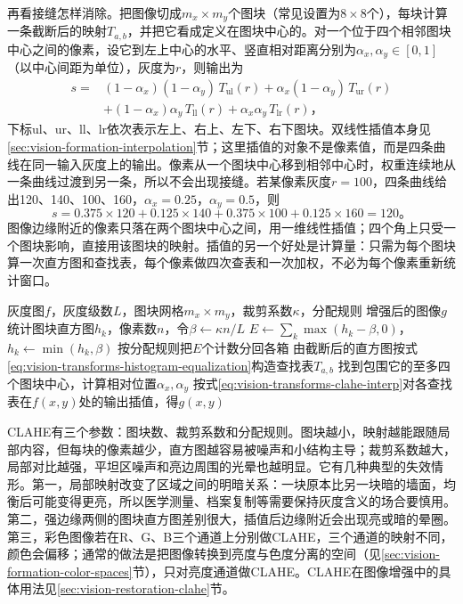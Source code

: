 再看接缝怎样消除。把图像切成$m_x\times m_y$个图块（常见设置为$8\times8$个），每块计算一条截断后的映射$T_{a,b}$，并把它看成定义在图块中心的。对一个位于四个相邻图块中心之间的像素，设它到左上中心的水平、竖直相对距离分别为$\alpha_x,\alpha_y\in[0,1]$（以中心间距为单位），灰度为$r$，则输出为
\begin{equation}
  \begin{aligned}
  s={}&(1-\alpha_x)(1-\alpha_y)\,T_{\mathrm{ul}}(r)+\alpha_x(1-\alpha_y)\,T_{\mathrm{ur}}(r)\\
  &+(1-\alpha_x)\alpha_y\,T_{\mathrm{ll}}(r)+\alpha_x\alpha_y\,T_{\mathrm{lr}}(r)\text{，}
  \end{aligned}
  \label{eq:vision-transforms-clahe-interp}
\end{equation}
下标ul、ur、ll、lr依次表示左上、右上、左下、右下图块。双线性插值本身见\ref{sec:vision-formation-interpolation}节；这里插值的对象不是像素值，而是四条曲线在同一输入灰度上的输出。像素从一个图块中心移到相邻中心时，权重连续地从一条曲线过渡到另一条，所以不会出现接缝。若某像素灰度$r=100$，四条曲线给出120、140、100、160，$\alpha_x=0.25$，$\alpha_y=0.5$，则
\[
  s=0.375\times120+0.125\times140+0.375\times100+0.125\times160=120\text{。}
\]
图像边缘附近的像素只落在两个图块中心之间，用一维线性插值；四个角上只受一个图块影响，直接用该图块的映射。插值的另一个好处是计算量：只需为每个图块算一次直方图和查找表，每个像素做四次查表和一次加权，不必为每个像素重新统计窗口。

\begin{algorithm}[受限局部直方图均衡化]
  \label{alg:vision-transforms-clahe}
  \begin{algorithmic}[1]
    \Require 灰度图$f$，灰度级数$L$，图块网格$m_x\times m_y$，裁剪系数$\kappa$，分配规则
    \Ensure 增强后的图像$g$
      \State 统计图块直方图$h_k$，像素数$n$，令$\beta\gets\kappa n/L$
      \Repeat
        \State $E\gets\sum_k\max(h_k-\beta,0)$，$h_k\gets\min(h_k,\beta)$
        \State 按分配规则把$E$个计数分回各箱
      \State 由截断后的直方图按式\eqref{eq:vision-transforms-histogram-equalization}构造查找表$T_{a,b}$
    \EndFor
      \State 找到包围它的至多四个图块中心，计算相对位置$\alpha_x,\alpha_y$
      \State 按式\eqref{eq:vision-transforms-clahe-interp}对各查找表在$f(x,y)$处的输出插值，得$g(x,y)$
    \EndFor
  \end{algorithmic}
\end{algorithm}

CLAHE有三个参数：图块数、裁剪系数和分配规则。图块越小，映射越能跟随局部内容，但每块的像素越少，直方图越容易被噪声和小结构主导；裁剪系数越大，局部对比越强，平坦区噪声和亮边周围的光晕也越明显。它有几种典型的失效情形。第一，局部映射改变了区域之间的明暗关系：一块原本比另一块暗的墙面，均衡后可能变得更亮，所以医学测量、档案复制等需要保持灰度含义的场合要慎用。第二，强边缘两侧的图块直方图差别很大，插值后边缘附近会出现亮或暗的晕圈。第三，彩色图像若在R、G、B三个通道上分别做CLAHE，三个通道的映射不同，颜色会偏移；通常的做法是把图像转换到亮度与色度分离的空间（见\ref{sec:vision-formation-color-spaces}节），只对亮度通道做CLAHE。CLAHE在图像增强中的具体用法见\ref{sec:vision-restoration-clahe}节。

